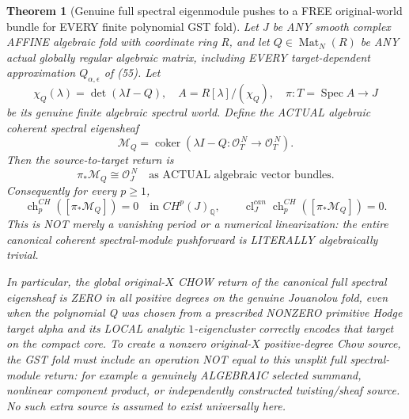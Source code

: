 \documentclass[11pt]{article}
\newtheorem{theorem}{Theorem}[section]
\begin{document}
\begin{theorem}[Genuine full spectral eigenmodule pushes to a FREE original-world bundle for EVERY finite polynomial GST fold]
Let $J$ be ANY smooth complex AFFINE
algebraic fold with coordinate ring R,
and let $Q\in\operatorname{Mat}_N(R)$
be ANY actual globally regular
algebraic matrix, including EVERY
target-dependent approximation
$Q_{\alpha,\epsilon}$ of (55).
Let
\[
 \chi_Q(\lambda)=\det(\lambda I-Q),
 \quad
 A=R[\lambda]/(\chi_Q),
 \quad
 \pi:T=\operatorname{Spec}A\to J
\]
be its genuine finite algebraic spectral
world. Define the ACTUAL algebraic
coherent spectral eigensheaf
\[
 \mathcal M_Q=
 \operatorname{coker}\left(
   \lambda I-Q:\mathcal O_T^{\,N}
                         \to\mathcal O_T^{\,N}
                         \right).
\]
Then the source-to-target return is
\[
 \boxed{\pi_*\mathcal M_Q
                  \cong\mathcal O_J^{\,N}
             \quad\text{as ACTUAL algebraic
                         vector bundles}.}            \tag{63}
\]
Consequently for every $p\ge1$,
\[
 \boxed{
 \operatorname{ch}^{CH}_p
        ([\pi_*\mathcal M_Q])=0
       \quad\text{in }CH^p(J)_{\mathbb Q},
 \qquad
 \operatorname{cl}^{can}_J
        \operatorname{ch}^{CH}_p
             ([\pi_*\mathcal M_Q])=0.}           \tag{64}
\]
This is NOT merely a vanishing
period or a numerical linearization:
the entire canonical coherent
spectral-module pushforward is
LITERALLY algebraically trivial.

In particular, the global original-$X$
CHOW return of the canonical full
spectral eigensheaf is ZERO in all
positive degrees on the genuine
Jouanolou fold, even when the
polynomial Q was chosen from a
prescribed NONZERO primitive Hodge
target alpha and its LOCAL analytic
$1$-eigencluster correctly encodes
that target on the compact core.
To create a nonzero original-$X$
positive-degree Chow source, the
GST fold must include an operation
NOT equal to this unsplit full
spectral-module return: for
example a genuinely ALGEBRAIC
selected summand, nonlinear
component product, or independently
constructed twisting/sheaf source.
No such extra source is assumed
to exist universally here.
\end{theorem}
\end{document}
